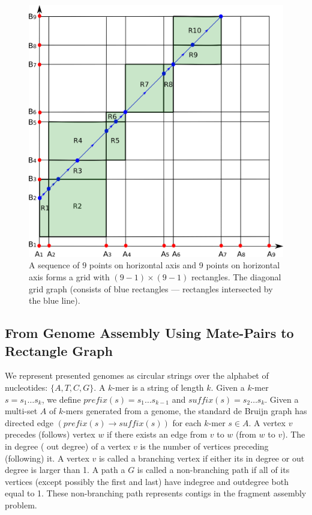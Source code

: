 \documentclass[a4paper]{article}
\begin{document}
\begin{figure}
\includegraphics[scale=0.3]{fig/gridGraph.eps}
\caption{A sequence of $9$ points on horizontal axis and 9 points on horizontal axis forms a grid with $(9-1) \times (9-1)$ rectangles.
The diagonal grid graph (consists of blue rectangles --- rectangles intersected by the blue line). }
\end{figure}



\subsection{From Genome Assembly Using Mate-Pairs to Rectangle Graph}




We represent presented genomes as circular strings over the alphabet of nucleotides: $\{A,T,C,G\}$. 
A $k$-mer is a string of length $k$.
Given a $k$-mer $s = s_1\ldots s_k$,
we define $prefix(s)= s_1\ldots s_{k-1}$ and $suffix(s) = s_2\ldots s_k$. Given a multi-set $A$ of $k$-mers generated from a genome, 
the standard de Bruijn graph has directed edge $(prefix(s) \rightarrow suffix(s))$
for each $k$-mer $s\in A$.  A vertex $v$  precedes (follows) vertex $w$ if there exists an edge from $v$ to $w$ (from $w$ to $v$). The in degree ( out degree)  of a vertex 
$v$ is the number of vertices preceding (following) it.  A vertex $v$ is called a branching vertex if either its in degree or out degree is larger than 1. A path a $G$ is called a non-branching path if all of its vertices (except possibly the first and last) have indegree and outdegree
both equal to 1. These non-branching path represents contigs in the fragment assembly problem.
\end{document}

